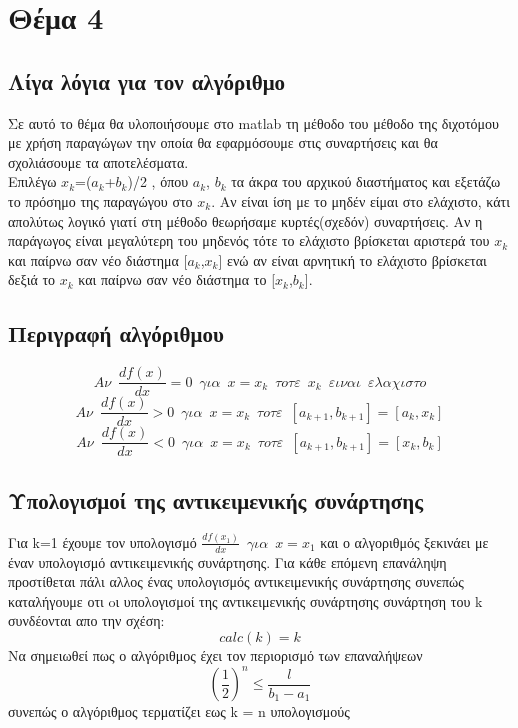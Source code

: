 \documentclass{article}
\begin{document}
  \section*{Θέμα 4}
  \subsection*{Λίγα λόγια για τον αλγόριθμο} 
Σε αυτό το θέμα θα υλοποιήσουμε στο matlab τη μέθοδο του μέθοδο της διχοτόμου με
χρήση παραγώγων την οποία θα εφαρμόσουμε στις συναρτήσεις και θα σχολιάσουμε τα αποτελέσματα.\\
  Επιλέγω $x_k$=($a_k$+$b_k$)/2 , όπου $a_k$, $b_k$ τα άκρα του αρχικού διαστήματος και εξετάζω
το πρόσημο της παραγώγου στο $x_k$. Αν είναι ίση με το μηδέν είμαι στο ελάχιστο, κάτι απολύτως
λογικό γιατί στη μέθοδο θεωρήσαμε κυρτές(σχεδόν) συναρτήσεις. Αν η παράγωγος είναι
μεγαλύτερη του μηδενός τότε το ελάχιστο βρίσκεται αριστερά του $x_k$ και παίρνω σαν νέο
διάστημα [$a_k$,$x_k$] ενώ αν είναι αρνητική το ελάχιστο βρίσκεται δεξιά το $x_k$ και παίρνω σαν νέο
διάστημα το [$x_k$,$b_k$].
\subsection*{Περιγραφή αλγόριθμου}
\begin{equation*}
Aν \enspace \frac{df(x)}{dx} = 0 \enspace για \enspace x = x_k \enspace τοτε \enspace x_k \enspace ειναι \enspace ελαχιστο
\end{equation*}
\begin{equation*}
Αν \enspace \frac{df(x)}{dx} >0 \enspace για \enspace x=x_k \enspace τοτε \enspace [a_{k+1},b_{k+1}] = [a_k,x_k]
\end{equation*}
\begin{equation*}
Αν \enspace \frac{df(x)}{dx} <0 \enspace για \enspace x=x_k \enspace τοτε \enspace [a_{k+1},b_{k+1}] = [x_k,b_k]
\end{equation*}
  \subsection*{Υπολογισμοί της αντικειμενικής συνάρτησης}
Για k=1 έχουμε τον υπολογισμό $\frac{df(x_1)}{dx} \enspace για \enspace x = x_1$ και ο αλγοριθμός ξεκινάει με έναν υπολογισμό αντικειμενικής συνάρτησης. Για κάθε επόμενη επανάληψη προστίθεται πάλι αλλος ένας υπολογισμός αντικειμενικής συνάρτησης συνεπώς καταλήγουμε οτι oι υπολογισμοί της αντικειμενικής συνάρτησης συνάρτηση του k συνδέονται απο την σχέση:
\begin{equation*}
\boxed{calc(k) = k} 
\end{equation*}
Να σημειωθεί πως ο αλγόριθμος έχει τον περιορισμό των επαναλήψεων
\begin{equation*}
(\frac{1}{2})^n \leq \frac{l}{b_1 - a_1}
\end{equation*}
συνεπώς ο αλγόριθμος τερματίζει εως k = n υπολογισμούς 
\end{document}
